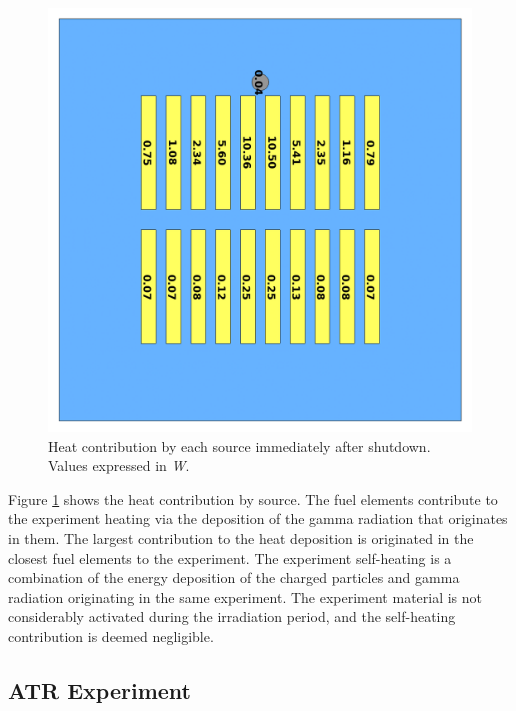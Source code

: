 \begin{figure}[htbp!] %
    \centering
    \includegraphics[width=0.70\linewidth]{figures/reference-contribs}
    \hfill
    \caption{Heat contribution by each source immediately after shutdown. Values expressed in \textit{W}.}
    \label{fig:demo-contrib}
\end{figure}

Figure \ref{fig:demo-contrib} shows the heat contribution by source.
The fuel elements contribute to the experiment heating via the deposition of the gamma radiation that originates in them.
The largest contribution to the heat deposition is originated in the closest fuel elements to the experiment.
The experiment self-heating is a combination of the energy deposition of the charged particles and gamma radiation originating in the same experiment.
The experiment material is not considerably activated during the irradiation period, and the self-heating contribution is deemed negligible.


\subsection{ATR Experiment}
\label{sec:atrexp}



